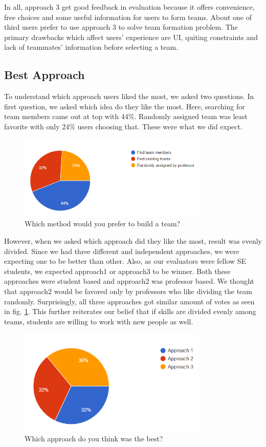 \documentclass[conference]{IEEEtran}
\begin{document}
In all, approach 3 get good feedback in evaluation because it offers convenience, free choices and some useful information for users to form teams. About one of third users prefer to use approach 3 to solve team formation problem. The primary drawbacks which affect users' experience are UI, quiting constraints and lack of teammates' information before selecting a team. 


\subsection{Best Approach}
To understand which approach users liked the most, we asked two questions. In first question, we asked which idea do they like the most. Here, searching for team members came out at top with 44\%. Randomly assigned team was least favorite with only 24\% users choosing that. These were what we did expect.
\begin{figure}[H]
    \centering
    \includegraphics[width=9cm]{image/ChoosingMethod.PNG}
    \caption{Which method would you prefer to build a team?}
\end{figure}

However, when we asked which approach did they like the most, result was evenly divided. Since we had three different and independent approaches, we were expecting one to be better than other. Also, as our evaluators were fellow SE students, we expected approach1 or approach3 to be winner. Both these approaches were student based and approach2 was professor based. We thought that approach2 would be favored only by professors who like dividing the team randomly. Surprisingly, all three approaches got similar amount of votes as seen in fig. \ref{bestapp.gf}. This further reiterates our belief that if skills are divided evenly among teams, students are willing to work with new people as well. 
\begin{figure}[H]
    \centering
    \includegraphics[width=9cm]{image/ChoosingApproach.PNG}
    \caption{Which approach do you think was the best?}
    \label{bestapp.gf}
\end{figure}
\end{document}
